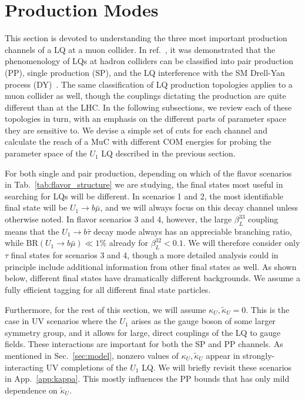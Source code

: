 \documentclass[a4paper,11pt]{article}
\newcommand{\muc}{MuC}
\begin{document}
\section{Production Modes}
\label{sec:production}


This section is devoted to understanding the three most important production channels of a LQ at a muon collider.
In ref.~\cite{Schmaltz:2018nls}, it was demonstrated that the phenomenology of LQs at hadron colliders can be classified into pair production (PP), single production (SP), and the LQ interference with the SM Drell-Yan process (DY)~\cite{Bansal:2018eha,Raj:2016aky}.
The same classification of LQ production topologies applies to a muon collider as well, though the couplings dictating the production are quite different than at the LHC.
In the following subsections, we review each of these topologies in turn, with an emphasis on the different parts of parameter space they are sensitive to.
We devise a simple set of cuts for each channel and calculate the reach of a \muc{} with different COM energies for probing the parameter space of the $U_1$ LQ described in the previous section.

For both single and pair production, depending on which of the flavor scenarios in Tab.~\ref{tab:flavor_structure} we are studying, the final states most useful in searching for LQs will be different. 
In scenarios 1 and 2, the most identifiable final state will be $U_1 \to b\bar{\mu}$, and we will always focus on this decay channel unless otherwise noted.
In flavor scenarios 3 and 4, however, the large $\beta_L^{33}$ coupling means that the $U_1 \to b\bar{\tau}$ decay mode always has an appreciable branching ratio, while $\textrm{BR}(U_1 \to b\bar{\mu}) \ll 1\%$ already for $\beta_L^{32} < 0.1$. We will therefore consider only $\tau$ final states for scenarios 3 and 4, though a more detailed analysis could in principle include additional information from other final states as well. As shown below, different final states have dramatically different backgrounds. We assume a fully efficient tagging for all different final state particles.  

Furthermore, for the rest of this section, we will assume $\kappa_U,\tilde{\kappa}_U = 0$.
This is the case in UV scenarios where the $U_1$ arises as the gauge boson of some larger symmetry group, and it allows for large, direct couplings of the LQ to gauge fields. These interactions are important for both the SP and PP channels. As mentioned in Sec.~\ref{sec:model}, 
nonzero values of $\kappa_U, \tilde{\kappa}_U$ appear in strongly-interacting UV completions of the $U_1$ LQ. We will briefly revisit these scenarios in App.~\ref{app:kappa}. This mostly influences the PP bounds that has only mild dependence on $\tilde{\kappa}_U$.
\end{document}
